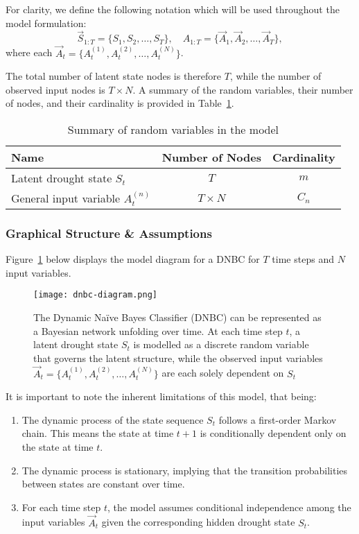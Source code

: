 For clarity, we define the following notation which will be used throughout the model formulation:
\[
\vec{S}_{1:T} = \{S_1, S_2, \dots, S_T\}, \quad 
A_{1:T} = \{\vec{A}_1, \vec{A}_2, \dots, \vec{A}_T\},
\]
where each $\vec{A}_t = \{A_t^{(1)}, A_t^{(2)}, \dots, A_t^{(N)}\}$.  

The total number of latent state nodes is therefore $T$, while the number of observed input nodes is $T \times N$. A summary of the random variables, their number of nodes, and their cardinality is provided in Table~\ref{tab:RVs}.

\begin{table}[H]
\centering
\caption{Summary of random variables in the model}
\label{tab:RVs}
\begin{tabular}{lcc}
\hline
\textbf{Name} & \textbf{Number of Nodes} & \textbf{Cardinality} \\ \hline
Latent drought state $S_t$ & $T$ & $m$ \\
General input variable $A_t^{(n)}$ & $T \times N$ & $C_n$ \\
\hline
\end{tabular}
\end{table}

\subsubsection{Graphical Structure \& Assumptions}

Figure~\ref{fig:dnbc-diagram} below displays the model diagram for a DNBC for $T$ time steps and $N$ input variables.  

\begin{figure}[!h]
    \centering
    \texttt{[image: dnbc-diagram.png]}
    \caption[TODO]{
The Dynamic Naïve Bayes Classifier (DNBC) can be represented as a Bayesian network unfolding over time. At each time step $t$, a latent drought state $S_t$ is modelled as a discrete random variable that governs the latent structure, while the observed input variables $\vec{A}_t = \{A_t^{(1)}, A_t^{(2)}, \dots, A_t^{(N)}\}$ are each solely dependent on $S_t$}
    \label{fig:dnbc-diagram}
\end{figure}

It is important to note the inherent limitations of this model, that being:
\begin{enumerate}[label=(\roman*)]
    \item The dynamic process of the state sequence $S_t$ follows a first-order Markov chain. This means the state at time $t+1$ is conditionally dependent only on the state at time $t$. \label{item:assumption_1}
    \item The dynamic process is stationary, implying that the transition probabilities between states are constant over time. \label{item:assumption_2}
    \item For each time step $t$, the model assumes conditional independence among the input variables $\vec{A}_t$ given the corresponding hidden drought state $S_t$. \label{item:assumption_3}
\end{enumerate}

